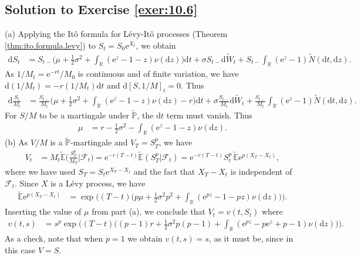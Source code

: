 \documentclass[12pt]{book}
\numberwithin{equation}{chapter}
\theoremstyle{plain}
\numberwithin{theorem}{section}
\theoremstyle{definition}
\numberwithin{exercise}{chapter}
\newcommand{\<}{\langle}
\renewcommand{\>}{\rangle}
\renewcommand{\(}{\left(}
\renewcommand{\)}{\right)}
\renewcommand{\[}{\left[}
\renewcommand{\]}{\right]}
\newcommand\Eb{\mathds{E}}
\newcommand\Pb{\mathds{P}}
\newcommand\Rb{\mathds{R}}
\newcommand\Fc{\mathscr{F}}
\newcommand\sig{\sigma}
\newcommand\Ebt{\widetilde{\Eb}}
\newcommand\Pbt{\widetilde{\Pb}}
\newcommand\Wt{\widetilde{W}}
\newcommand\Nt{\widetilde{N}}
\newcommand\dd{\mathrm{d}}
\newcommand\ee{\mathrm{e}}
\begin{document}
\subsection*{Solution to Exercise \ref{exer:10.6}}
(a) Applying the It\^o formula for L\'evy-It\^o processes (Theorem \ref{thm:ito.formula.levy}) to $S_t = S_0 \ee^{X_t}$, we obtain
\begin{align}
\dd S_t
	&=	S_{t-} \Big( \mu + \tfrac{1}{2} \sig^2 + \int_\Rb ( \ee^z - 1 - z ) \nu(\dd z) \Big) \dd t
			+ \sig S_{t-} \dd \Wt_t + S_{t-} \int_\Rb ( \ee^z - 1 ) \Nt(\dd t, \dd z) .
\end{align}
As $1/M_t = \ee^{-rt}/M_0$ is continuous and of finite variation, we have $\dd (1/M_t) = - r (1/M_t) \dd t$ and $\dd [S,1/M]_t = 0$.  Thus
\begin{align}
\dd \frac{S_t}{M_t}
	&=	\frac{S_{t-}}{M_t} \Big( \mu + \tfrac{1}{2} \sig^2 + \int_\Rb ( \ee^z - 1 - z ) \nu(\dd z) - r \Big) \dd t
			+ \sig \frac{S_{t-}}{M_t} \dd \Wt_t + \frac{S_{t-}}{M_t} \int_\Rb ( \ee^z - 1 ) \Nt(\dd t, \dd z) .
\end{align}
For $S/M$ to be a martingale under $\Pbt$, the $\dd t$ term must vanish.  Thus
\begin{align}
\mu
	&=	r - \tfrac{1}{2} \sig^2 - \int_\Rb ( \ee^z - 1 - z ) \nu(\dd z) .
\end{align}
(b) As $V/M$ is a $\Pbt$-martingale and $V_T = S_T^p$, we have
\begin{align}
V_t
	&=	M_t \Ebt \Big( \frac{S_T^p}{M_T} \Big| \Fc_t \Big)
	=		\ee^{-r(T-t)} \Ebt ( S_T^p | \Fc_t )
	=		\ee^{-r(T-t)} S_t^p \, \Ebt \ee^{p (X_T - X_t)} ,
\end{align}
where we have used $S_T = S_t \ee^{X_T - X_t}$ and the fact that $X_T - X_t$ is independent of $\Fc_t$.  Since $X$ is a L\'evy process, we have
\begin{align}
\Ebt \ee^{p (X_T - X_t)}
	&=	\exp \Big( (T-t) \Big( p \mu + \tfrac{1}{2} \sig^2 p^2 + \int_\Rb ( \ee^{pz} - 1 - p z ) \nu(\dd z) \Big) \Big) .
\end{align}
Inserting the value of $\mu$ from part (a), we conclude that $V_t = v(t,S_t)$ where
\begin{align}
v(t,s)
	&=	s^p \exp \Big( (T-t) \Big( (p-1) r + \tfrac{1}{2} \sig^2 p (p-1) + \int_\Rb ( \ee^{pz} - p \ee^z + p - 1 ) \nu(\dd z) \Big) \Big) .
\end{align}
As a check, note that when $p = 1$ we obtain $v(t,s) = s$, as it must be, since in this case $V = S$.
\end{document}
